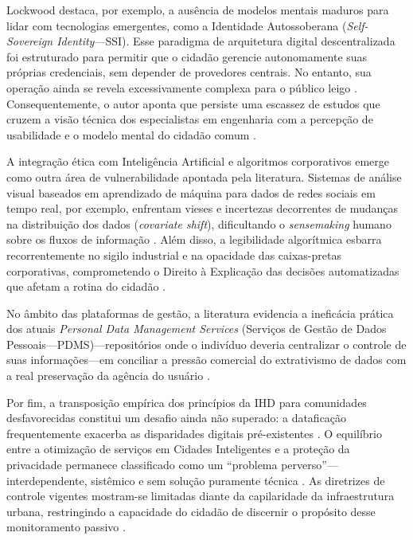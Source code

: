 \documentclass[12pt]{article}
\begin{document}
    Lockwood \cite{Lockwood2021, Lockwood2020AnAccessible} destaca, por exemplo, a ausência de modelos mentais maduros para lidar com tecnologias emergentes, como a Identidade Autossoberana (\textit{Self-Sovereign Identity}---SSI). Esse paradigma de arquitetura digital descentralizada foi estruturado para permitir que o cidadão gerencie autonomamente suas próprias credenciais, sem depender de provedores centrais. No entanto, sua operação ainda se revela excessivamente complexa para o público leigo \cite{Lockwood2021, Lockwood2020AnAccessible}. Consequentemente, o autor aponta que persiste uma escassez de estudos que cruzem a visão técnica dos especialistas em engenharia com a percepção de usabilidade e o modelo mental do cidadão comum \cite{Lockwood2020AnAccessible}.

   A integração ética com Inteligência Artificial e algoritmos corporativos emerge como outra área de vulnerabilidade apontada pela literatura. Sistemas de análise visual baseados em aprendizado de máquina para dados de redes sociais em tempo real, por exemplo, enfrentam vieses e incertezas decorrentes de mudanças na distribuição dos dados (\textit{covariate shift}), dificultando o \textit{sensemaking} humano sobre os fluxos de informação \cite{Haghighati2020}. Além disso, a legibilidade algorítmica esbarra recorrentemente no sigilo industrial e na opacidade das caixas-pretas corporativas, comprometendo o Direito à Explicação das decisões automatizadas que afetam a rotina do cidadão \cite{Barreto2018} \cite{DeAlmeida2019}.

    No âmbito das plataformas de gestão, a literatura evidencia a ineficácia prática dos atuais \textit{Personal Data Management Services} (Serviços de Gestão de Dados Pessoais---PDMS)---repositórios onde o indivíduo deveria centralizar o controle de suas informações---em conciliar a pressão comercial do extrativismo de dados com a real preservação da agência do usuário \cite{angelopoulos2021stewardship}.

    Por fim, a transposição empírica dos princípios da IHD para comunidades desfavorecidas constitui um desafio ainda não superado: a dataficação frequentemente exacerba as disparidades digitais pré-existentes \cite{hayes2024making, Locoro2020}. O equilíbrio entre a otimização de serviços em Cidades Inteligentes e a proteção da privacidade permanece classificado como um ``problema perverso''---interdependente, sistêmico e sem solução puramente técnica \cite{Meireles2016, Chowdhury2016}. As diretrizes de controle vigentes mostram-se limitadas diante da capilaridade da infraestrutura urbana, restringindo a capacidade do cidadão de discernir o propósito desse monitoramento passivo \cite{Mashhadi2014}.
\end{document}
